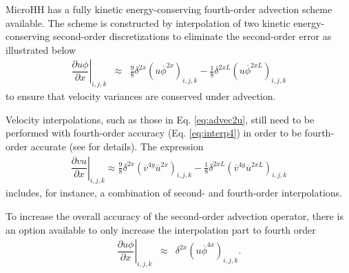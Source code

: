 \documentclass[gmd,manuscript]{copernicus}
\begin{document}
MicroHH has a fully kinetic energy-conserving fourth-order advection scheme \citep{Morinishi1998} available. The scheme is constructed by interpolation of two kinetic energy-conserving second-order discretizations to eliminate the second-order error as illustrated below
\begin{eqnarray}
\left. \dfrac{\partial u \phi}{\partial x} \right|_{i,j,k} & \approx & \frac{9}{8} \delta^{2x} \left( u \overline{\phi}^{2x} \right)_{i,j,k} 
                                                             - \frac{1}{8} \delta^{2xL} \left( u \overline{\phi}^{2xL} \right)_{i,j,k}%
\end{eqnarray}
to ensure that velocity variances are conserved under advection.

Velocity interpolations, such as those in Eq. \ref{eq:advec2u}, still need to be performed with fourth-order accuracy (Eq. \ref{eq:interp4}) in order to  be fourth-order accurate (see \citet{Morinishi1998} for details). The expression
\begin{eqnarray}
\left. \dfrac{\partial v u}{\partial x}\right|_{i,j,k} \approx \frac{9}{8} \delta^{2x} \left( \overline{v}^{4y} \overline{u}^{2x} \right)_{i,j,k} 
                                       - \frac{1}{8} \delta^{2xL} \left( \overline{v}^{4y} \overline{u}^{2xL} \right)_{i,j,k}
\end{eqnarray}
includes, for instance, a combination of second- and fourth-order interpolations.

To increase the overall accuracy of the second-order advection operator, there is an option available to only increase the interpolation part to fourth order
\begin{eqnarray}
\left. \dfrac{\partial u \phi}{\partial x}\right|_{i,j,k}
& \approx & 
\delta^{2x} \left( u \overline{\phi}^{4x} \right)_{i,j,k}.
\end{eqnarray}
\end{document}
